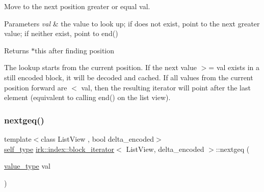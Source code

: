 Move to the next position greater or equal {\ttfamily val}. 


\begin{DoxyParams}{Parameters}
{\em val} & the value to look up; if does not exist, point to the next greater value; if neither exist, point to {\ttfamily end()} \\
\hline
\end{DoxyParams}
\begin{DoxyReturn}{Returns}
{\ttfamily $\ast$this} after finding position
\end{DoxyReturn}
The lookup starts from the current position. If the next value {\ttfamily $>$= val} exists in a still encoded block, it will be decoded and cached. If all values from the current position forward are {\ttfamily $<$ val}, then the resulting iterator will point after the last element (equivalent to calling {\ttfamily end()} on the list view). \mbox{\label{classirk_1_1index_1_1block__iterator_aff7b154913783f7984e50c11efa10cb1}} 
\subsubsection{\texorpdfstring{nextgeq()}{nextgeq()}}
{\footnotesize\ttfamily template$<$class List\+View , bool delta\+\_\+encoded$>$ \\
\mbox{\hyperlink{classirk_1_1index_1_1block__iterator_a338ee8fee726492e9f8bbad4b4d75766}{self\+\_\+type}} \mbox{\hyperlink{classirk_1_1index_1_1block__iterator}{irk\+::index\+::block\+\_\+iterator}}$<$ List\+View, delta\+\_\+encoded $>$\+::nextgeq (\begin{DoxyParamCaption}\item[{\mbox{\hyperlink{classirk_1_1index_1_1block__iterator_a4d6c5b58cedd871e8a8f235e425e8587}{value\+\_\+type}}}]{val }\end{DoxyParamCaption})\hspace{0.3cm}{\ttfamily [inline]}}

\mbox{\label{classirk_1_1index_1_1block__iterator_afc88fc6cd2cd2a148b821e5e89b6649a}} 
